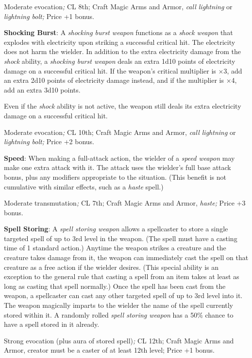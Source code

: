 Moderate evocation\textit{; }CL 8th; Craft Magic Arms and Armor, \textit{call lightning }or \textit{lightning bolt; }Price +1 bonus.
				
\textbf{Shocking Burst}: A \textit{shocking burst weapon} functions as a \textit{shock weapon} that explodes with electricity upon striking a successful critical hit. The electricity does not harm the wielder. In addition to the extra electricity damage from the \textit{shock} ability, a \textit{shocking burst weapon} deals an extra 1d10 points of electricity damage on a successful critical hit. If the weapon's critical multiplier is \mbox{$\times$}3, add an extra 2d10 points of electricity damage instead, and if the multiplier is \mbox{$\times$}4, add an extra 3d10 points.
				
Even if the \textit{shock} ability is not active, the weapon still deals its extra electricity damage on a successful critical hit.
				
Moderate evocation\textit{; }CL 10th; Craft Magic Arms and Armor, \textit{call lightning }or \textit{lightning bolt; }Price +2 bonus.
				
\textbf{Speed}: When making a full-attack action, the wielder of a \textit{speed weapon} may make one extra attack with it. The attack uses the wielder's full base attack bonus, plus any modifiers appropriate to the situation. (This benefit is not cumulative with similar effects, such as a \textit{haste }spell.)
				
Moderate transmutation\textit{; }CL 7th; Craft Magic Arms and Armor, \textit{haste; }Price +3 bonus.
				
\textbf{Spell Storing}: A \textit{spell storing weapon} allows a spellcaster to store a single targeted spell of up to 3rd level in the weapon. (The spell must have a casting time of 1 standard action.) Anytime the weapon strikes a creature and the creature takes damage from it, the weapon can immediately cast the spell on that creature as a free action if the wielder desires. (This special ability is an exception to the general rule that casting a spell from an item takes at least as long as casting that spell normally.) Once the spell has been cast from the weapon, a spellcaster can cast any other targeted spell of up to 3rd level into it. The weapon magically imparts to the wielder the name of the spell currently stored within it. A randomly rolled \textit{spell storing weapon} has a 50\% chance to have a spell stored in it already.
				
Strong evocation (plus aura of stored spell)\textit{; }CL 12th; Craft Magic Arms and Armor, creator must be a caster of at least 12th level; Price +1 bonus.
				
